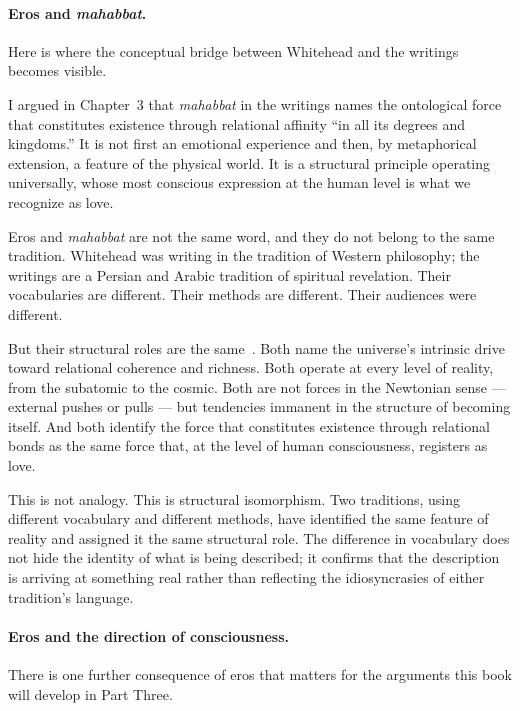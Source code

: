 \paragraph{Eros and \textit{mahabbat}.}

Here is where the conceptual bridge between Whitehead and the \bahai writings
becomes visible.

I argued in Chapter~3 that \textit{mahabbat} in the \bahai writings names
the ontological force that constitutes existence through relational affinity
``in all its degrees and kingdoms.''
It is not first an emotional experience and then, by metaphorical extension,
a feature of the physical world.
It is a structural principle operating universally, whose most conscious
expression at the human level is what we recognize as love.

Eros and \textit{mahabbat} are not the same word, and they do not belong
to the same tradition.
Whitehead was writing in the tradition of Western philosophy; the \bahai
writings are a Persian and Arabic tradition of spiritual revelation.
Their vocabularies are different.
Their methods are different.
Their audiences were different.

But their structural roles are the same~\citeyearpar{AdamsMahabbat}.
Both name the universe's intrinsic drive toward relational coherence and
richness.
Both operate at every level of reality, from the subatomic to the cosmic.
Both are not forces in the Newtonian sense --- external pushes or pulls ---
but tendencies immanent in the structure of becoming itself.
And both identify the force that constitutes existence through relational
bonds as the same force that, at the level of human consciousness, registers
as love.

This is not analogy.
This is structural isomorphism.
Two traditions, using different vocabulary and different methods,
have identified the same feature of reality and assigned it the same
structural role.
The difference in vocabulary does not hide the identity of what is being
described; it confirms that the description is arriving at something real
rather than reflecting the idiosyncrasies of either tradition's language.

\paragraph{Eros and the direction of consciousness.}

There is one further consequence of eros that matters for the arguments
this book will develop in Part Three.

